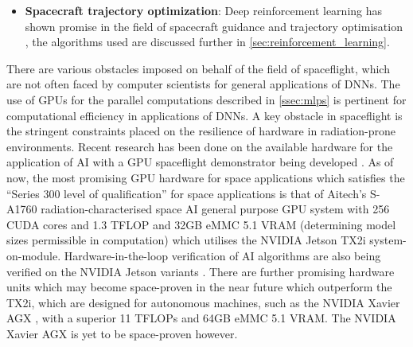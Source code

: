\begin{itemize}



    \item \textbf{Spacecraft trajectory optimization}:
    Deep reinforcement learning has shown promise in the field of spacecraft guidance and trajectory optimisation \cite{Kolosa2019, Hovell2020}, the algorithms used are discussed further in \autoref{sec:reinforcement_learning}.
\end{itemize}

There are various obstacles imposed on behalf of the field of spaceflight, which are not often faced by computer scientists for general applications of \glspl{DNN}. The use of \glspl{GPU} for the parallel computations described in \autoref{ssec:mlps} is pertinent for computational efficiency in applications of \glspl{DNN}. A key obstacle in spaceflight is the stringent constraints placed on the resilience of hardware in radiation-prone environments. Recent research has been done on the available hardware for the application of \gls{AI} \cite{Kosmidis2019, Murphy2021, Wilson2022} with a \gls{GPU} spaceflight demonstrator being developed \cite{White2018}. As of now, the most promising \gls{GPU} hardware for space applications which satisfies the ``Series 300 level of qualification'' for space applications is that of Aitech's S-A1760 radiation-characterised space \gls{AI} general purpose \gls{GPU} system with 256 \gls{CUDA} cores and 1.3 \gls{TFLOP} and 32GB eMMC 5.1 \gls{VRAM} (determining model sizes permissible in computation) which utilises the NVIDIA Jetson TX2i system-on-module. Hardware-in-the-loop verification of \gls{AI} algorithms are also being verified on the NVIDIA Jetson variants \cite{Wilson2022}. There are further promising hardware units which may become space-proven in the near future which outperform the TX2i, which are designed for autonomous machines, such as the NVIDIA Xavier AGX \cite{Murphy2021}, with a superior 11 \glspl{TFLOP} and 64GB eMMC 5.1 \gls{VRAM}. The NVIDIA Xavier AGX is yet to be space-proven however.


